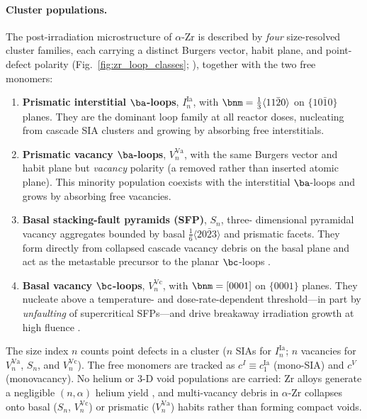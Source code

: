\paragraph{Cluster populations.}
The post-irradiation microstructure of $\alpha$-Zr is described by
\emph{four} size-resolved cluster families, each carrying a distinct
Burgers vector, habit plane, and point-defect polarity
(Fig.~\ref{fig:zr_loop_classes}; \citealp{Carpenter1988,Northwood1977,%
OnimusBechade2012,Yi2013,Doriot2015}), together with the two free
monomers:
\begin{enumerate}\itemsep2pt
  \item \textbf{Prismatic interstitial $\ba$-loops}, $I_n^{\mathrm{Ia}}$,
        with $\bnm=\tfrac13\langle 11\bar20\rangle$ on $\{10\bar10\}$
        planes. They are the dominant loop family at all reactor doses,
        nucleating from cascade SIA clusters and growing by absorbing
        free interstitials.
  \item \textbf{Prismatic vacancy $\ba$-loops}, $V_n^{\mathrm{Va}}$,
        with the same Burgers vector and habit plane but \emph{vacancy}
        polarity (a removed rather than inserted atomic plane). This
        minority population coexists with the interstitial $\ba$-loops
        and grows by absorbing free vacancies.
  \item \textbf{Basal stacking-fault pyramids (SFP)}, $S_n$, three-%
        dimensional pyramidal vacancy aggregates bounded by basal
        $\tfrac16\langle20\bar23\rangle$ and prismatic facets. They form
        directly from collapsed cascade vacancy debris on the basal
        plane and act as the metastable precursor to the planar
        $\bc$-loops \citep{Carpenter1988,Northwood1977,Doriot2015}.
  \item \textbf{Basal vacancy $\bc$-loops}, $V_n^{\mathrm{Vc}}$, with
        $\bnm=[0001]$ on $\{0001\}$ planes. They nucleate above a
        temperature- and dose-rate-dependent threshold---in part by
        \emph{unfaulting} of supercritical SFPs---and drive breakaway
        irradiation growth at high fluence
        \citep{Holt1988,HoltCausey1993,Yi2013}.
\end{enumerate}
The size index $n$ counts point defects in a cluster ($n$ SIAs for
$I_n^{\mathrm{Ia}}$; $n$ vacancies for $V_n^{\mathrm{Va}}$, $S_n$, and
$V_n^{\mathrm{Vc}}$). The free monomers are tracked as $c^I\equiv
c_1^{\mathrm{Ia}}$ (mono-SIA) and $c^V$ (monovacancy). No helium or
3-D void populations are carried: Zr alloys generate a negligible
$(n,\alpha)$ helium yield \citep{Northwood1977,OnimusBechade2012}, and
multi-vacancy debris in $\alpha$-Zr collapses onto basal ($S_n$, $V_n^{\mathrm{Vc}}$)
or prismatic ($V_n^{\mathrm{Va}}$) habits rather than forming compact voids.

